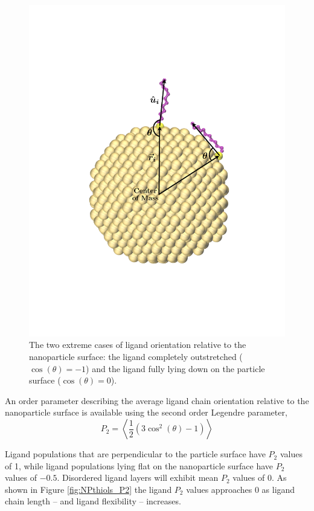 \documentclass[aps,jcp,preprint,showpacs,superscriptaddress,groupedaddress]{revtex4-1}  %
\begin{document}
\begin{figure}
  \includegraphics[width=\linewidth]{figures/NP_pAngle}
  \caption{The two extreme cases of ligand orientation relative to the
    nanoparticle surface: the ligand completely outstretched
    ($\cos{(\theta)} = -1$) and the ligand fully lying down on the
    particle surface ($\cos{(\theta)} = 0$).}
  \label{fig:NP_pAngle}
\end{figure}

An order parameter describing the average ligand chain orientation relative to
the nanoparticle surface is available using the second order Legendre
parameter,
\begin{equation}
	P_2 = \left< \frac{1}{2} \left(3\cos^2(\theta) - 1 \right) \right>
\end{equation}

Ligand populations that are perpendicular to the particle surface have
$P_2$ values of 1, while ligand populations lying flat on the
nanoparticle surface have $P_2$ values of $-0.5$. Disordered ligand
layers will exhibit mean $P_2$ values of 0. As shown in Figure
\ref{fig:NPthiols_P2} the ligand $P_2$ values approaches 0 as
ligand chain length -- and ligand flexibility -- increases.
\end{document}
